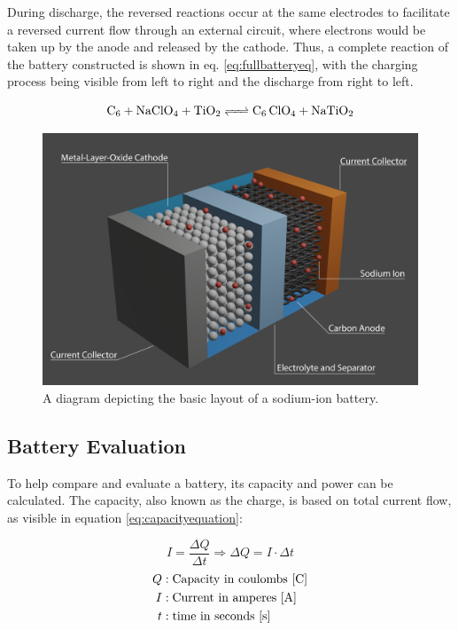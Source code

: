 During discharge, the reversed reactions occur at the same electrodes to facilitate a reversed current flow through an external circuit, where electrons would be taken up by the anode and released by the cathode. Thus, a complete reaction of the battery constructed is shown in eq. \ref{eq:fullbatteryeq}, with the charging process being visible from left to right and the discharge from right to left.

\begin{equation}\label{eq:fullbatteryeq}
    \ce{C6 + NaClO4 + TiO2 <=> C6 ClO4 + NaTiO2}
\end{equation}

\begin{figure}[ht]
    \centering
    \includegraphics[width=\textwidth]{images/sodium_ion_battery_figure.png}
    \caption{A diagram depicting the basic layout of a sodium-ion battery.}
    \label{fig:sodiumbatterydiagram}
\end{figure}

\newpage

\subsection{Battery Evaluation}

To help compare and evaluate a battery, its capacity and power can be calculated. The capacity, also known as the charge, is based on total current flow, as visible in equation \ref{eq:capacityequation}:

\begin{equation}\label{eq:capacityequation}
    I = \frac{\Delta Q}{\Delta t} \Rightarrow \Delta Q = I \cdot \Delta t
\end{equation}
\begin{align*}
    Q &: \text{Capacity in coulombs [\unit{\C}]}\\
    I &: \text{Current in amperes [\unit{\A}]}\\
    t &: \text{time in seconds [\unit{\s}]}
\end{align*}

